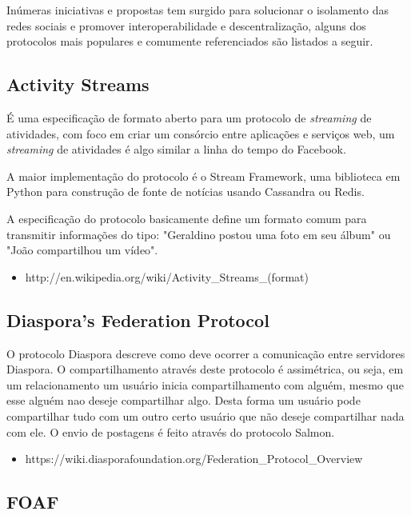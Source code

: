 \documentclass[12pt]{article}
\begin{document}
Inúmeras iniciativas e propostas tem surgido para solucionar o isolamento das
redes sociais e promover interoperabilidade e descentralização, alguns
dos protocolos mais populares e comumente referenciados são listados a seguir.

\subsection{Activity Streams}

É uma especificação de formato aberto para um protocolo de {\it streaming} de
atividades, com foco em criar um consórcio entre aplicações e serviços
web, um {\it streaming} de atividades é algo similar a linha do tempo do
Facebook.

A maior implementação do protocolo é o Stream Framework\cite{stream}, uma
biblioteca em Python para construção de fonte de notícias usando Cassandra ou
Redis.

A especificação do protocolo\cite{streams} basicamente define um formato comum
para transmitir informações do tipo: "Geraldino postou uma foto em seu álbum"
ou "João compartilhou um vídeo".

\begin{itemize}
  \item http://en.wikipedia.org/wiki/Activity\_Streams\_(format)
\end{itemize}

\subsection{Diaspora's Federation Protocol}

O protocolo Diaspora descreve como deve ocorrer a comunicação entre servidores
Diaspora. O compartilhamento através deste protocolo é assimétrica, ou seja,
em um relacionamento um usuário inicia compartilhamento com alguém, mesmo que
esse alguém nao deseje compartilhar algo. Desta forma um usuário pode
compartilhar tudo com um outro certo usuário que não deseje compartilhar nada
com ele. O envio de postagens é feito através do protocolo Salmon.

\begin{itemize}
  \item https://wiki.diasporafoundation.org/Federation\_Protocol\_Overview
\end{itemize}

\subsection{FOAF}
\end{document}
